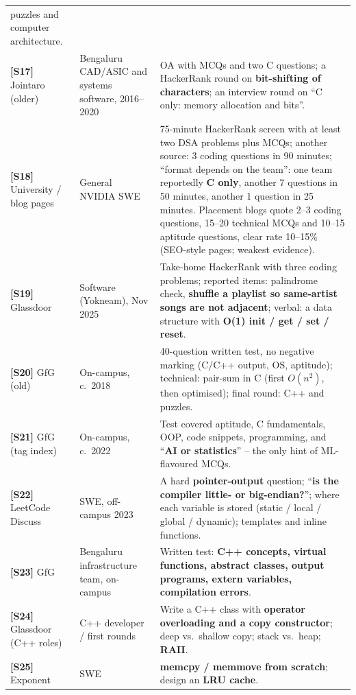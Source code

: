 \documentclass[10pt,a4paper,openany,oneside]{report}
\begin{document}
{\begin{longtable}{@{}>{\raggedright\arraybackslash}p{2.1cm}>{\raggedright\arraybackslash}p{3.1cm}p{10.6cm}@{}}
 puzzles and computer architecture.\\
\textbf{[S17]} Jointaro (older) & Bengaluru CAD/ASIC and systems software, 2016--2020 &
 OA with MCQs and two C questions; a HackerRank round on \textbf{bit-shifting of characters}; an interview round on ``C only: memory allocation and bits''.\\
\textbf{[S18]} University / blog pages & General NVIDIA SWE &
 75-minute HackerRank screen with at least two DSA problems plus MCQs; another source: 3 coding questions in 90 minutes; ``format depends on the team'':
 one team reportedly \textbf{C only}, another 7 questions in 50 minutes, another 1 question in 25 minutes. Placement blogs quote 2--3 coding questions,
 15--20 technical MCQs and 10--15 aptitude questions, clear rate 10--15\% (SEO-style pages; weakest evidence).\\
\textbf{[S19]} Glassdoor & Software (Yokneam), Nov 2025 &
 Take-home HackerRank with three coding problems; reported items: palindrome check, \textbf{shuffle a playlist so same-artist songs are not adjacent};
 verbal: a data structure with \textbf{O(1) init / get / set / reset}.\\
\textbf{[S20]} GfG (old) & On-campus, c.\ 2018 &
 40-question written test, no negative marking (C/C++ output, OS, aptitude); technical: pair-sum in C (first $O(n^2)$, then optimised);
 final round: C++ and puzzles.\\
\textbf{[S21]} GfG (tag index) & On-campus, c.\ 2022 &
 Test covered aptitude, C fundamentals, OOP, code snippets, programming, and ``\textbf{AI or statistics}'' -- the only hint of ML-flavoured MCQs.\\
\textbf{[S22]} LeetCode Discuss & SWE, off-campus 2023 &
 A hard \textbf{pointer-output} question; ``\textbf{is the compiler little- or big-endian?}''; where each variable is stored (static / local / global / dynamic);
 templates and inline functions.\\
\textbf{[S23]} GfG & Bengaluru infrastructure team, on-campus &
 Written test: \textbf{C++ concepts, virtual functions, abstract classes, output programs, extern variables, compilation errors}.\\
\textbf{[S24]} Glassdoor (C++ roles) & C++ developer / first rounds &
 Write a C++ class with \textbf{operator overloading and a copy constructor}; deep vs.\ shallow copy; stack vs.\ heap; \textbf{RAII}.\\
\textbf{[S25]} Exponent & SWE &
 \textbf{memcpy / memmove from scratch}; design an \textbf{LRU cache}.\\
\bottomrule
\end{longtable}}
\end{document}
